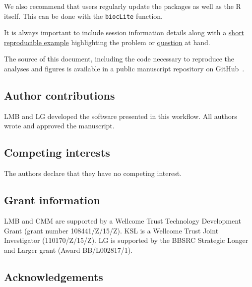 We also recommend that users regularly update the packages as well as
the R itself. This can be done with the \texttt{biocLite} function.

\begin{knitrout}
\color{fgcolor}\begin{kframe}
\begin{alltt}
\hlstd{(}\hlstd{)}
\hlstd{()}
\end{alltt}
\end{kframe}
\end{knitrout}

It is always important to include session information details along
with a \href{http://adv-r.had.co.nz/Reproducibility.html}{short
  reproducible example} highlighting the problem or
\href{https://support.bioconductor.org/}{question} at hand. 

The source of this document, including the code necessary to reproduce
the analyses and figures is available in a public manuscript
repository on GitHub~\cite{ghrepo}. 

\bigskip

\subsection*{Author contributions}

LMB and LG developed the software presented in this workflow. All
authors wrote and approved the manuscript.

\subsection*{Competing interests}

The authors declare that they have no competing interest. 

\subsection*{Grant information}

LMB and CMM are supported by a Wellcome Trust Technology Development
Grant (grant number 108441/Z/15/Z). KSL is a Wellcome Trust Joint
Investigator (110170/Z/15/Z). LG is supported by the BBSRC Strategic
Longer and Larger grant (Award BB/L002817/1).


\subsection*{Acknowledgements}

